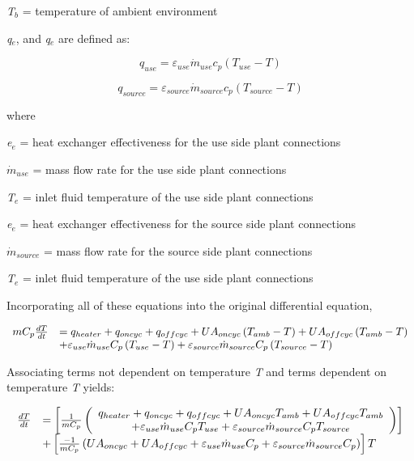 \emph{T\(_{b}\)} = temperature of ambient environment

\emph{q\(_{e}\)}, and \emph{q\(_{e}\)} are defined as:

\begin{equation}
{q_{use}} = {\varepsilon_{use}}{\dot m_{use}}{c_p}\left( {{T_{use}} - T} \right)
\end{equation}

\begin{equation}
{q_{source}} = {\varepsilon_{source}}{\dot m_{source}}{c_p}\left( {{T_{source}} - T} \right)
\end{equation}

where

\emph{e\(_{e}\)} = heat exchanger effectiveness for the use side plant connections

\({\dot m_{use}}\) = mass flow rate for the use side plant connections

\emph{T\(_{e}\)} = inlet fluid temperature of the use side plant connections

\emph{e\(_{e}\)} = heat exchanger effectiveness for the source side plant connections

\({\dot m_{source}}\) = mass flow rate for the source side plant connections

\emph{T\(_{e}\)} = inlet fluid temperature of the use side plant connections

Incorporating all of these equations into the original differential equation,

\begin{equation}
  \begin{array}{ll}
    mC_p\frac{dT}{dt} &= q_{heater} + q_{oncyc} + q_{offcyc} + UA_{oncyc} \PB{T_{amb} - T} + UA_{offcyc} \PB{T_{amb} - T} \\ 
                      &+ \varepsilon_{use}\dot{m}_{use}C_p \PB{T_{use} - T} + \varepsilon_{source}\dot{m}_{source}C_p \PB{T_{source} - T}
  \end{array}
\end{equation}

Associating terms not dependent on temperature \emph{T} and terms dependent on temperature \emph{T} yields:

\begin{equation}
  \begin{array}{ll}
    \frac{dT}{dt} &= \RB{\frac{1}{mC_p}\PB{\begin{array}{c}
                                             q_{heater}+q_{oncyc}+q_{offcyc}+UA_{oncyc}T_{amb}+UA_{offcyc}T_{amb} \\
                                             + \varepsilon_{use}\dot{m}_{use}C_pT_{use} + \varepsilon_{source}\dot{m}_{source}C_pT_{source}
                                           \end{array}}} \\
                  &+ \RB{\frac{-1}{mC_p}\PB{UA_{oncyc} + UA_{offcyc}+\varepsilon_{use}\dot{m}_{use}C_p+\varepsilon_{source}\dot{m}_{source}C_p}}T
  \end{array}
\end{equation}

